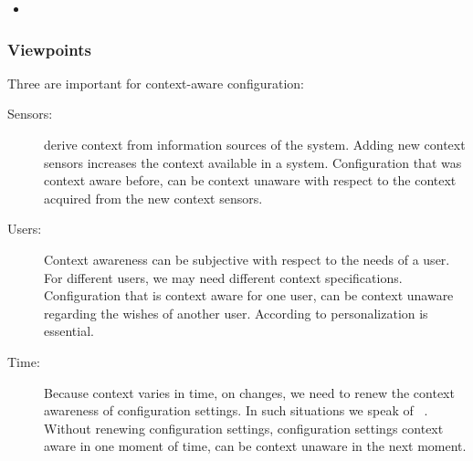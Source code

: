 \begin{itemize}
\item[]
\end{itemize}


\subsubsection{Viewpoints}


Three  are important for context-aware configuration:

\begin{description}
\item[Sensors:]  derive context from information sources of the system.
Adding new context sensors increases the context available in a system.
Configuration that was context aware before, can be context unaware with respect to the context acquired from the new context sensors.

\item[Users:] Context awareness can be subjective with respect to the needs of a user.
For different users, we may need different context specifications.
Configuration that is context aware for one user, can be context unaware regarding the wishes of another user.
According to \citet{khalil2005context,khalil2005improving} personalization is essential.

\item[Time:] Because context varies in time, on changes, we need to renew the context awareness of configuration settings.
In such situations we speak of ~\cite{geihs2009comprehensive,kamina2014context}.
Without renewing configuration settings, configuration settings context aware in one moment of time, can be context unaware in the next moment.
\end{description}

